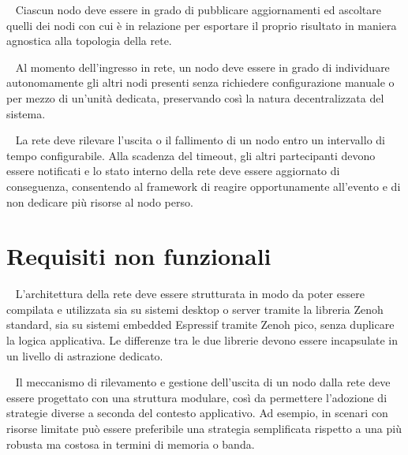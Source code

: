 \begin{functionalrequirements}
	~\label{requirement:nodes-communication}
	Ciascun nodo deve essere in grado di pubblicare aggiornamenti ed ascoltare
	quelli dei nodi con cui è in relazione per esportare il proprio risultato in
	maniera agnostica alla topologia della rete.

	~\label{requirement:nodes-discovery}
    Al momento dell'ingresso in rete, un nodo deve essere in grado di individuare
    autonomamente gli altri nodi presenti senza richiedere configurazione manuale
    o per mezzo di un'unità dedicata, preservando così la natura decentralizzata
    del sistema.

	~\label{requirement:offline-node-detection}
	La rete deve rilevare l'uscita o il fallimento di un nodo entro un intervallo
	di tempo configurabile. Alla scadenza del timeout, gli altri partecipanti devono
	essere notificati e lo stato interno della rete deve essere aggiornato di
	conseguenza, consentendo al framework di reagire opportunamente all'evento
	e di non dedicare più risorse al nodo perso.
\end{functionalrequirements}

\section{Requisiti non funzionali}
\label{sec:non-functional-requirements}

\begin{nonfunctionalrequirements}
	~\label{requirement:zenoh-portability}
	L'architettura della rete deve essere strutturata in modo da poter essere compilata
	e utilizzata sia su sistemi desktop o server tramite la libreria Zenoh standard,
	sia su sistemi embedded Espressif tramite Zenoh pico, senza duplicare la
	logica applicativa. Le differenze tra le due librerie devono essere
	incapsulate in un livello di astrazione dedicato.

	~\label{requirement:alternative-offline-nodes-detection-strategies}
	Il meccanismo di rilevamento e gestione dell'uscita di un nodo dalla rete deve
	essere progettato con una struttura modulare, così da permettere l'adozione
	di strategie diverse a seconda del contesto applicativo.
	Ad esempio, in scenari con risorse limitate può essere preferibile una strategia
	semplificata rispetto a una più robusta ma costosa in termini di memoria o banda.
\end{nonfunctionalrequirements}
